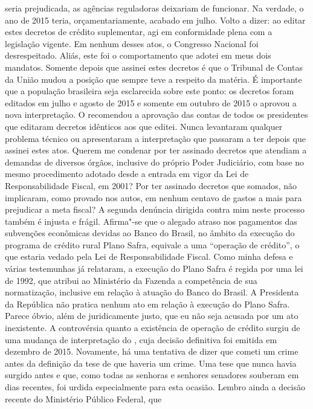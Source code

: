 seria prejudicada, as agências reguladoras deixariam de funcionar. Na
verdade, o ano de 2015 teria, orçamentariamente, acabado em julho. Volto
a dizer: ao editar estes decretos de crédito suplementar, agi em
conformidade plena com a legislação vigente. Em nenhum desses atos, o
Congresso Nacional foi desrespeitado. Aliás, este foi o comportamento
que adotei em meus dois mandatos. Somente depois que assinei estes
decretos é que o Tribunal de Contas da União mudou a posição que sempre
teve a respeito da matéria. É importante que a população brasileira seja
esclarecida sobre este ponto: os decretos foram editados em julho e
agosto de 2015 e somente em outubro de 2015 o  aprovou a nova
interpretação. O  recomendou a aprovação das contas de todos os
presidentes que editaram decretos idênticos aos que editei. Nunca
levantaram qualquer problema técnico ou apresentaram a interpretação que
passaram a ter depois que assinei estes atos. Querem me condenar por ter
assinado decretos que atendiam a demandas de diversos órgãos, inclusive
do próprio Poder Judiciário, com base no mesmo procedimento adotado
desde a entrada em vigor da Lei de Responsabilidade Fiscal, em 2001? Por
ter assinado decretos que somados, não implicaram, como provado nos
autos, em nenhum centavo de gastos a mais para prejudicar a meta fiscal?
A segunda denúncia dirigida contra mim neste processo também é injusta e
frágil. Afirma"-se que o alegado atraso nos pagamentos das subvenções
econômicas devidas ao Banco do Brasil, no âmbito da execução do programa
de crédito rural Plano Safra, equivale a uma ``operação de crédito'', o
que estaria vedado pela Lei de Responsabilidade Fiscal. Como minha
defesa e várias testemunhas já relataram, a execução do Plano Safra é
regida por uma lei de 1992, que atribui ao Ministério da Fazenda a
competência de sua normatização, inclusive em relação à atuação do Banco
do Brasil. A Presidenta da República não pratica nenhum ato em relação à
execução do Plano Safra. Parece óbvio, além de juridicamente justo, que
eu não seja acusada por um ato inexistente. A controvérsia quanto a
existência de operação de crédito surgiu de uma mudança de interpretação
do , cuja decisão definitiva foi emitida em dezembro de 2015.
Novamente, há uma tentativa de dizer que cometi um crime antes da
definição da tese de que haveria um crime. Uma tese que nunca havia
surgido antes e que, como todas as senhoras e senhores senadores
souberam em dias recentes, foi urdida especialmente para esta ocasião.
Lembro ainda a decisão recente do Ministério Público Federal, que
